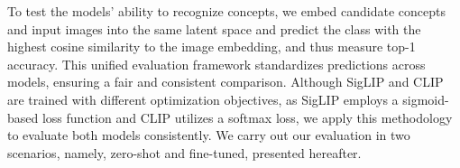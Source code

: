 \documentclass[11pt]{article}
\newcommand{\benchmark}{Concept-10k}
\begin{document}

To test the models’ ability to recognize concepts, we embed candidate concepts and input images into the same latent space and predict the class with the highest cosine similarity to the image embedding, and thus measure top-1 accuracy. This unified evaluation framework standardizes predictions across models, ensuring a fair and consistent comparison.
Although SigLIP and CLIP are trained with different optimization objectives, as SigLIP employs a sigmoid-based loss function and CLIP utilizes a softmax loss, we apply this methodology to evaluate both models consistently.
We carry out our evaluation in two scenarios, namely, zero-shot and fine-tuned, presented hereafter.

\end{document}
